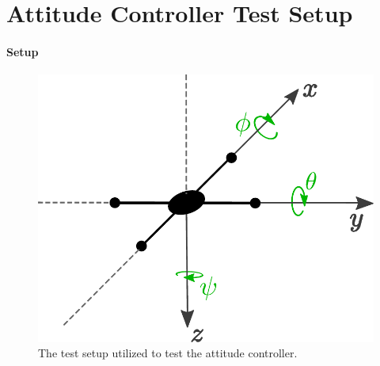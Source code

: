 \chapter{Attitude Controller Test Setup}\label{app:AttitudeControllerTest} 

\subsubsection{Setup}
\begin{figure}[H]
	\centering
	\includegraphics[scale=0.4]{figures/plusConfiguration}
	\caption{The test setup utilized to test the attitude controller.}
	\label{fig:AttitudeControllerTestsetup}
\end{figure}

